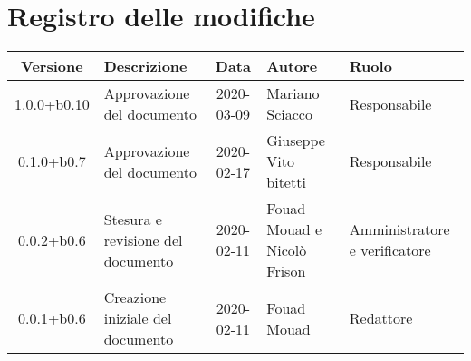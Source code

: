 \section*{Registro delle modifiche}

\begin{center}
	\begin{longtable}{|c|p{3.5cm}|c|p{3cm}|p{3cm}|}
	\hline
	\rowcolor{lighter-grayer}
	\textbf{Versione} & \textbf{Descrizione} & \textbf{Data} & \textbf{Autore} & \textbf{Ruolo} \\
	\hline
	\endfirsthead


	1.0.0+b0.10 & Approvazione del documento & 2020-03-09 & Mariano Sciacco & Responsabile \\
	\hline
	0.1.0+b0.7 & Approvazione del documento & 2020-02-17 & Giuseppe Vito bitetti & Responsabile \\
	\hline
	0.0.2+b0.6 & Stesura e revisione del documento & 2020-02-11 & Fouad Mouad e Nicolò Frison & Amministratore e verificatore \\
	\hline
	0.0.1+b0.6 & Creazione iniziale del documento & 2020-02-11 & Fouad Mouad & Redattore \\
	\hline

	\end{longtable}
\end{center}